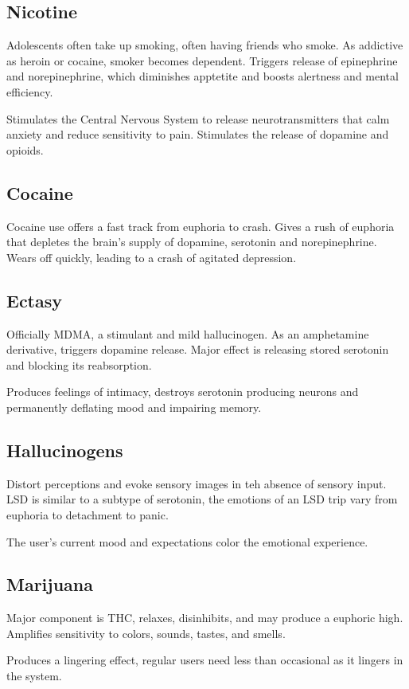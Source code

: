 \documentclass[12pt]{article}
\begin{document}
\subsection*{Nicotine}
Adolescents often take up smoking, often having friends who smoke. As addictive as heroin or cocaine, smoker becomes dependent. Triggers release of epinephrine and norepinephrine, which diminishes apptetite and boosts alertness and mental efficiency. 

Stimulates the Central Nervous System to release neurotransmitters that calm anxiety and reduce sensitivity to pain. Stimulates the release of dopamine and opioids. 

\subsection*{Cocaine}
Cocaine use offers a fast track from euphoria to crash. Gives a rush of euphoria that depletes the brain's supply of dopamine, serotonin and norepinephrine. Wears off quickly, leading to a crash of agitated depression.

\subsection*{Ectasy}
Officially MDMA, a stimulant and mild hallucinogen. As an amphetamine derivative, triggers dopamine release. Major effect is releasing stored serotonin and blocking its reabsorption. 

Produces feelings of intimacy, destroys serotonin producing neurons and permanently deflating mood and impairing memory. 

\subsection*{Hallucinogens}
Distort perceptions and evoke sensory images in teh absence of sensory input. LSD is similar to a subtype of serotonin, the emotions of an LSD trip vary from euphoria to detachment to panic.

The user's current mood and expectations color the emotional experience. 

\subsection*{Marijuana}
Major component is THC, relaxes, disinhibits, and may produce a euphoric high. Amplifies sensitivity to colors, sounds, tastes, and smells. 

Produces a lingering effect, regular users need less than occasional as it lingers in the system. 
\end{document}
